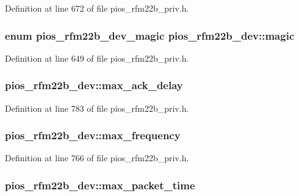 Definition at line 672 of file pios\-\_\-rfm22b\-\_\-priv.\-h.

\hypertarget{structpios__rfm22b__dev_acffebca4153749f86cd6237ac4482f3a}{
\subsubsection[{magic}]{\setlength{\rightskip}{0pt plus 5cm}enum {\bf pios\-\_\-rfm22b\-\_\-dev\-\_\-magic} pios\-\_\-rfm22b\-\_\-dev\-::magic}}\label{structpios__rfm22b__dev_acffebca4153749f86cd6237ac4482f3a}


Definition at line 649 of file pios\-\_\-rfm22b\-\_\-priv.\-h.

\hypertarget{structpios__rfm22b__dev_ad0342540c88cd117f4c82035cedb1f10}{
\subsubsection[{max\-\_\-ack\-\_\-delay}]{ pios\-\_\-rfm22b\-\_\-dev\-::max\-\_\-ack\-\_\-delay}}\label{structpios__rfm22b__dev_ad0342540c88cd117f4c82035cedb1f10}


Definition at line 783 of file pios\-\_\-rfm22b\-\_\-priv.\-h.

\hypertarget{structpios__rfm22b__dev_a98085c05f6be6d71a6fbe868ee5f29ef}{
\subsubsection[{max\-\_\-frequency}]{ pios\-\_\-rfm22b\-\_\-dev\-::max\-\_\-frequency}}\label{structpios__rfm22b__dev_a98085c05f6be6d71a6fbe868ee5f29ef}


Definition at line 766 of file pios\-\_\-rfm22b\-\_\-priv.\-h.

\hypertarget{structpios__rfm22b__dev_ab09ddb5c90f5e40bfe8b4be488144ef6}{
\subsubsection[{max\-\_\-packet\-\_\-time}]{ pios\-\_\-rfm22b\-\_\-dev\-::max\-\_\-packet\-\_\-time}}\label{structpios__rfm22b__dev_ab09ddb5c90f5e40bfe8b4be488144ef6}


